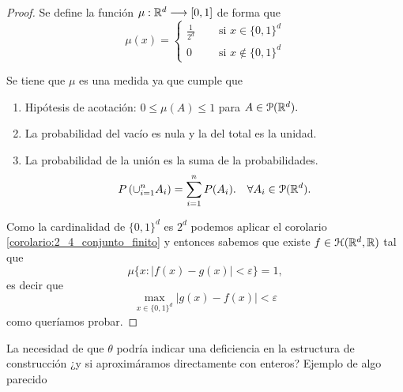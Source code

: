 \begin{proof}
    Se define la función $\mu : \mathbb{R}^d \longrightarrow [0,1]$ de forma que 
    \begin{equation}
        \mu(x) = 
      \left \{
    \begin{aligned}
      \frac{1}{2^d} \quad &\text{ si } x \in \{0,1\}^d \\
      0 \quad & \text{ si } x \notin \{0,1\}^d 
    \end{aligned}
  \right .
    \end{equation}

    Se tiene que $\mu$ es una medida ya que cumple que 
    \begin{enumerate}
        \item Hipótesis de acotación: $0 \leq \mu(A) \leq 1$ para $A \in \mathcal{P}(\mathbb{R}^d).$
        \item La probabilidad del vacío es nula y la del  total es la unidad. 
        \item La probabilidad de la unión es la suma de la probabilidades. 
        \begin{equation}
            P\left(
                \cup_{i=1}^n A_i
            \right)
            = \sum_{i=1}^n P(A_i).
            \quad
            \forall A_i \in  \mathcal{P}(\mathbb{R}^d).
        \end{equation}
    \end{enumerate}  

    Como la cardinalidad de $\{0,1\}^d$ es $2^d$
    podemos aplicar el corolario \ref{corolario:2_4_conjunto_finito}
    y entonces sabemos que  existe $f\in \mathcal{H}(\mathbb{R}^d,\mathbb{R})$ tal que 
    \begin{equation}
            \mu\{ 
                x:
                |f(x) - g(x)| 
                < \varepsilon
            \}
            = 1,
    \end{equation} 
    es decir que 
    \begin{equation}
        \max_{x \in \{ 0,1\}^d} |g(x) - f(x)|
        < \varepsilon
    \end{equation}
    como queríamos probar. 
\end{proof}
\iconoAclaraciones \textcolor{dark_green}{ La necesidad de que $\theta$ podría indicar una deficiencia en la estructura de construcción ¿y si aproximáramos directamente con enteros?  
Ejemplo de algo parecido  \cite{Wang_2022}
}



